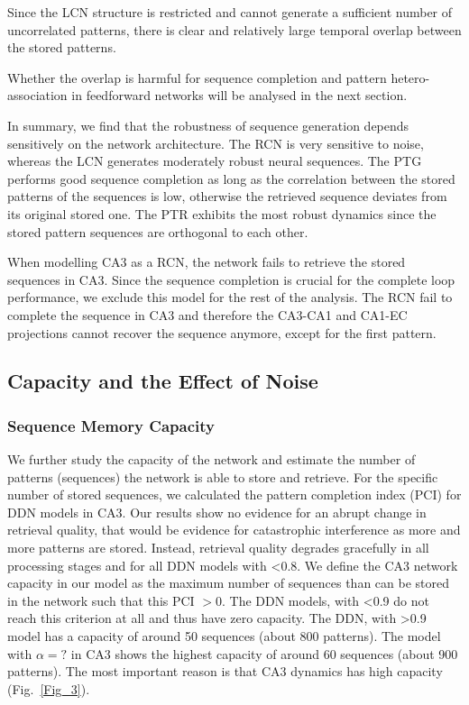 \documentclass[utf8]{frontiersSCNS} %
\begin{document}

Since the LCN structure is restricted and cannot generate a sufficient number of uncorrelated patterns, there is clear and relatively large temporal overlap between the stored patterns. 



Whether the overlap is harmful for sequence completion and pattern hetero-association in feedforward networks will be analysed in the next section. 


In summary, we find that the robustness of sequence generation depends sensitively on the network architecture. The RCN is very sensitive to noise, whereas the LCN generates moderately robust neural sequences. The PTG performs good sequence completion as long as the correlation between the stored patterns of the sequences is low, otherwise the retrieved sequence deviates from its original stored one. The PTR exhibits the most robust dynamics since the stored pattern sequences are orthogonal to each other.

When modelling CA3 as a RCN, the network fails to retrieve the stored sequences in CA3. Since the sequence completion is crucial for the complete loop performance, we exclude this model for the rest of the analysis.
The RCN fail to complete the sequence in CA3 and therefore the CA3-CA1 and CA1-EC projections cannot recover the sequence anymore, except for the first pattern.

\subsection{Capacity and the Effect of Noise}

\subsubsection{Sequence Memory Capacity}

We further study the capacity of the network and estimate the number of patterns (sequences) the network is able to store and retrieve. For the specific number of stored sequences, we calculated the pattern completion index (PCI) for DDN models in CA3. Our results show no evidence for an abrupt change in retrieval quality, that would be evidence for catastrophic interference as more and more patterns are stored. Instead, retrieval quality degrades gracefully in all processing stages and for all DDN models with <0.8. We define the CA3 network capacity in our model as the maximum number of sequences than can be stored in the network such that this PCI $> 0$.
The DDN models, with <0.9 do not reach this criterion at all and thus have zero capacity. The DDN, with >0.9 model has a capacity of around 50 sequences (about 800 patterns). The model with $\alpha = ?$ in CA3 shows the highest capacity of around 60 sequences (about 900 patterns). The most important reason is that CA3 dynamics has high capacity (Fig.~\ref{Fig_3}).  
\end{document}
